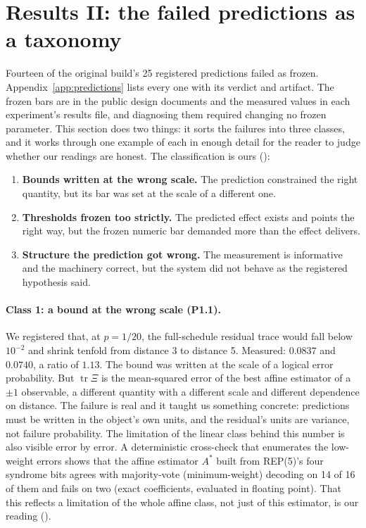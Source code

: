 \section{Results II: the failed predictions as a taxonomy}
\label{sec:negatives}

Fourteen of the original build's 25 registered predictions failed as frozen. %
Appendix~\ref{app:predictions} lists every one with its verdict and artifact. The frozen bars are in the public design documents and the measured values in each experiment's results file, and diagnosing them required changing no frozen parameter. This section does two things: it sorts the failures into three classes, and it works through one example of each in enough detail for the reader to judge whether our readings are honest. The classification is ours (\gInterp): %

\begin{enumerate}
\item \textbf{Bounds written at the wrong scale.} The prediction constrained the right quantity, but its bar was set at the scale of a different one.
\item \textbf{Thresholds frozen too strictly.} The predicted effect exists and points the right way, but the frozen numeric bar demanded more than the effect delivers.
\item \textbf{Structure the prediction got wrong.} The measurement is informative and the machinery correct, but the system did not behave as the registered hypothesis said.
\end{enumerate}

\paragraph{Class 1: a bound at the wrong scale (P1.1).} We registered that, at $p = 1/20$, the full-schedule residual trace would fall below $10^{-2}$ and shrink tenfold from distance 3 to distance 5. Measured: $0.0837$ and $0.0740$, a ratio of $1.13$. %
The bound was written at the scale of a logical error probability. But $\operatorname{tr}\Xi$ is the mean-squared error of the best affine estimator of a $\pm1$ observable, a different quantity with a different scale and different dependence on distance. The failure is real and it taught us something concrete: predictions must be written in the object's own units, and the residual's units are variance, not failure probability. The limitation of the linear class behind this number is also visible error by error. A deterministic cross-check that enumerates the low-weight errors shows that the affine estimator $A^{*}$ built from REP(5)'s four syndrome bits agrees with majority-vote (minimum-weight) decoding on 14 of 16 of them and fails on two (exact coefficients, evaluated in floating point). That this reflects a limitation of the whole affine class, not just of this estimator, is our reading (\gInterp). %

